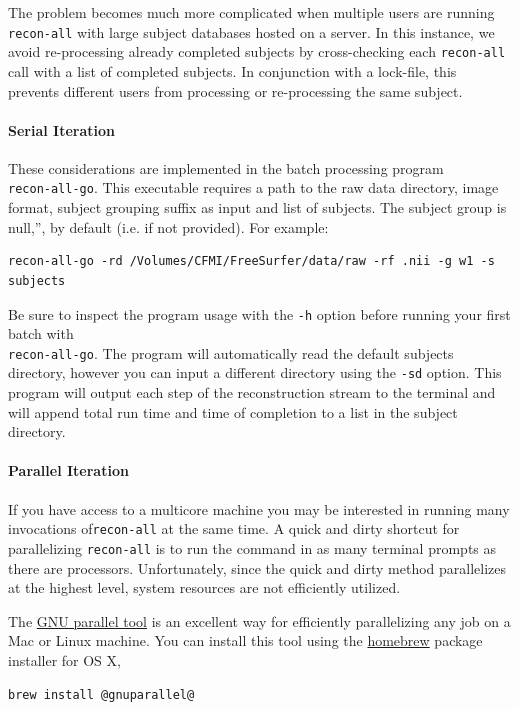 \documentclass[paper=a4, fontsize=11pt]{scrartcl} %
\numberwithin{equation}{section} %
\numberwithin{figure}{section} %
\numberwithin{table}{section} %
\begin{document}
The problem becomes much more complicated when multiple users are running \texttt{recon-all} with large subject databases hosted on a server.  In this instance, we avoid re-processing already completed subjects  by cross-checking each \texttt{recon-all} call with a list of completed subjects. In conjunction with a lock-file, this prevents different users from processing or re-processing the same subject.

\paragraph{Serial Iteration} These considerations are implemented in the batch processing program ~\\\texttt{recon-all-go}.  This executable requires a path to the raw data directory, image format, subject grouping suffix as input and list of subjects.  The subject group is null,'', by default (i.e. if not provided). For example:

\begin{lstlisting}
recon-all-go -rd /Volumes/CFMI/FreeSurfer/data/raw -rf .nii -g w1 -s subjects
\end{lstlisting}

Be sure to inspect the program usage with the \texttt{-h} option before running your first batch with ~\\ \texttt{recon-all-go}.  The program will automatically read the default subjects directory, however you can input a different directory using the \texttt{-sd} option. This program will output each step of the reconstruction stream to the terminal and will append total run time and time of completion to a list in the subject directory.

\paragraph{Parallel Iteration} If you have access to a multicore machine you may be interested in running many invocations  of\texttt{recon-all} at the same time.  A quick and dirty shortcut for parallelizing \texttt{recon-all} is to run the command in as many terminal prompts as there are processors.  Unfortunately, since the quick and dirty method parallelizes at the highest level, system resources are not efficiently utilized.  

The \href{https://www.gnu.org/software/parallel/}{GNU parallel tool} is an excellent way for efficiently parallelizing any job on a Mac or Linux machine.  You can install this tool using the \href{http://brew.sh}{homebrew} package installer for OS X,
\begin{lstlisting}
brew install @gnuparallel@
\end{lstlisting}
\end{document}
